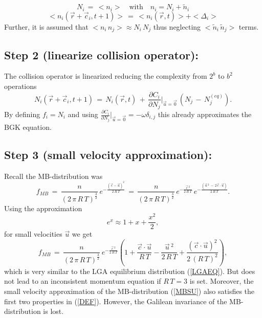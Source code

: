 \begin{equation}
  N_i \,=\, <n_i> \quad \mbox{with} \quad n_i = N_i + \tilde n_i\nonumber
\end{equation}
\begin{equation}
  <n_i(\vec r + \vec c_i, t+1)> \,=\, <n_i(\vec r , t)>  + <\Delta_i>\nonumber
\end{equation}
Further, it is assumed that $<n_i\, n_j> \approx N_i \, N_j$ thus neglecting $<\tilde n_i\, \tilde n_j>$ terms.

\subsection{Step 2 (linearize collision operator):}

The collision operator is linearized reducing the complexity from $2^b$ to $b^2$ operations
\begin{equation}
 N_i (\vec r + \vec c_i, t+1)\,=\, N_i(\vec r , t) \, + \, \frac{\partial{C_i}}{\partial{N_j}} \bigg |_{\vec u =\vec 0} \, (N_j\, -\, N_j^{(eq)} ).\nonumber
\end{equation}
By defining $f_i = N_i $ and using $\frac{\partial{C_i}}{\partial{N_j}} \big |_{\vec u =\vec 0} = - \omega \delta_{i,j}$ this already approximates the BGK equation.

\subsection{Step 3 (small velocity approximation):}

Recall the MB-distribution was
\begin{equation}
 f_{MB} \, = \, \frac{n}{(2 \, \pi \,R \, T )^{\frac{3}{2}}} \, e^{-\frac{(\vec c -\vec u)^2}{2 \,R \, T}}\, = \, \frac{n}{(2 \, \pi \,R \, T )^{\frac{3}{2}}} \, e^{-\frac{\vec c \,^2}{2 \,R \, T}} \,e^{-\frac{(\vec u\,^2 \,-\, 2 \vec c \cdot \vec u)}{2 \,R \, T}} .\nonumber
\end{equation}
Using the approximation
\begin{equation}
 e^x \approx 1 + x + \frac{x^2}{2},\nonumber
\end{equation}
for small velocities $\vec u$ we get
\begin{equation}
 f_{MB} \, = \, \frac{n}{(2 \, \pi \,R \, T )^{\frac{3}{2}}} \, e^{-\frac{\vec c \,^2}{2 \,R \, T}} \left( 1 + \frac{ \vec c \cdot \vec u}{R \, T} -\frac{\vec u\,^2 }{2 \,R \, T}   + \frac{ (\vec c \cdot \vec u)^2}{2 \, (R \, T)^2}  \right),\label{MBSU}
\end{equation}
which is very similar to the LGA equilibrium distribution (\ref{LGAEQ}). But does not lead to an inconsistent momentum equation if $R\,T =3$ is set. Moreover, the small velocity approximation of the MB-distribution (\ref{MBSU}) also satisfies the first two properties in (\ref{DEF}). However, the Galilean invariance of the MB-distribution is lost.

